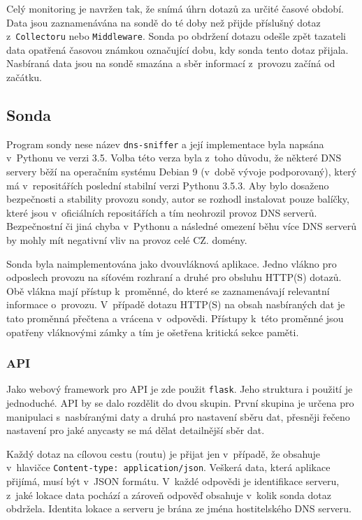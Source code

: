 \documentclass[thesis=M,czech]{src/FITthesis}[2019/12/23]
\begin{document}
Celý monitoring je navržen tak, že snímá úhrn dotazů za určité časové období. Data jsou zaznamenávána na sondě do té doby než přijde příslušný dotaz z~\texttt{Collectoru} nebo \texttt{Middleware}. Sonda po obdržení dotazu odešle zpět tazateli data opatřená časovou známkou označující dobu, kdy sonda tento dotaz přijala. Nasbíraná data jsou na sondě smazána a sběr informací z~provozu začíná od začátku.

\subsection{Sonda}
Program sondy nese název \texttt{dns-sniffer} a její implementace byla napsána v~Pythonu ve verzi 3.5. Volba této verza byla z~toho důvodu, že některé DNS servery běží na operačním systému Debian 9 (v~době vývoje podporovaný), který má v~repositářích poslední stabilní verzi Pythonu 3.5.3. Aby bylo dosaženo bezpečnosti a stability provozu sondy, autor se rozhodl instalovat pouze balíčky, které jsou v~oficiálních repositářích a tím neohrozil provoz DNS serverů. Bezpečnostní či jiná chyba v~Pythonu a následné omezení běhu více DNS serverů by mohly mít negativní vliv na provoz celé CZ. domény.

Sonda byla naimplementována jako dvouvláknová aplikace. Jedno vlákno pro odposlech provozu na síťovém rozhraní a druhé pro obsluhu HTTP(S) dotazů. Obě vlákna mají přístup k~proměnné, do které se zaznamenávají relevantní informace o~provozu. V~případě dotazu HTTP(S) na obsah nasbíraných dat je tato proměnná přečtena a vrácena v~odpovědi. Přístupy k~této proměnné jsou opatřeny vláknovými zámky a tím je ošetřena kritická sekce paměti.

\subsubsection{API}
Jako webový framework pro API je zde použit \texttt{flask}. Jeho struktura i použití je jednoduché. API by se dalo rozdělit do dvou skupin. První skupina je určena pro manipulaci s~nasbíranými daty a druhá pro nastavení sběru dat, přesněji řečeno nastavení pro jaké anycasty se má dělat detailnější sběr dat. 

Každý dotaz na cílovou cestu (routu) je přijat jen v~případě, že obsahuje v~hlavičce \texttt{Content-type: application/json}. Veškerá data, která aplikace přijímá, musí být v~JSON formátu. V~každé odpovědi je identifikace serveru, z~jaké lokace data pochází a zároveň odpověď obsahuje v~kolik sonda dotaz obdržela. Identita lokace a serveru je brána ze jména hostitelského DNS serveru. 
\end{document}
